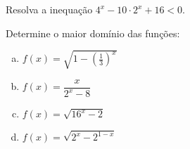 \begin{secExercicios}
 \begin{exer}
     Resolva a inequação $4^x-10\cdot 2^x+16<0$.
 \end{exer}

 \begin{exer}
     Determine o maior domínio das funções:
     \begin{enumerate}[a)]
         \item $f(x)=\sqrt{1-(\frac{1}{3})^x}$
         \item $f(x)=\dfrac{x}{2^x-8}$
         \item $f(x)=\sqrt{16^x-2}$
         \item $f(x)=\sqrt{2^x-2^{1-x}}$
     \end{enumerate}
 \end{exer}


\end{secExercicios}
 
